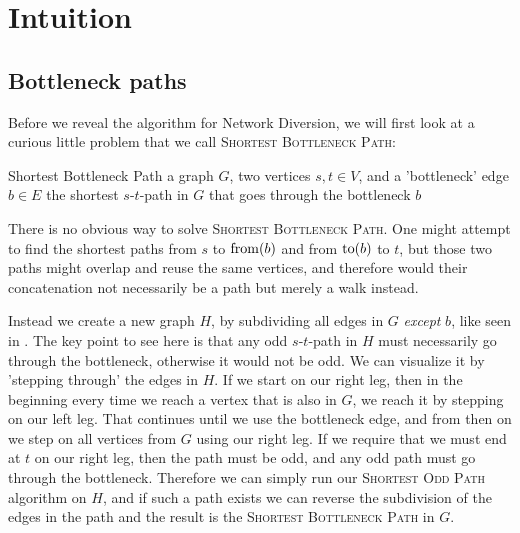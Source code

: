 \section{Intuition}
\subsection{Bottleneck paths}
\label{section:subdividing-bottlenecks}
Before we reveal the algorithm for Network Diversion, we will first look at a curious little problem that we call \textsc{Shortest Bottleneck Path}:

\problem
{Shortest Bottleneck Path}
{a graph $G$, two vertices $s,t \in V$, and a 'bottleneck' edge $b \in E$}
{the shortest $s$-$t$-path in $G$ that goes through the bottleneck $b$}


There is no obvious way to solve \textsc{Shortest Bottleneck Path}. One might attempt to find the shortest paths from $s$ to $\operatorname{from}(b)$ and from $\operatorname{to}(b)$ to $t$, but those two paths might overlap and reuse the same vertices, and therefore would their concatenation not necessarily be a path but merely a walk instead.

Instead we create a new graph $H$, by subdividing all edges in $G$ \emph{except} $b$, like seen in . The key point to see here is that any odd $s$-$t$-path in $H$ must necessarily go through the bottleneck, otherwise it would not be odd. We can visualize it by 'stepping through' the edges in $H$. If we start on our right leg, then in the beginning every time we reach a vertex that is also in $G$, we reach it by stepping on our left leg. That continues until we use the bottleneck edge, and from then on we step on all vertices from $G$ using our right leg. If we require that we must end at $t$ on our right leg, then the path must be odd, and any odd path must go through the bottleneck. Therefore we can simply run our \textsc{Shortest Odd Path} algorithm on $H$, and if such a path exists we can reverse the subdivision of the edges in the path and the result is the \textsc{Shortest Bottleneck Path} in $G$.

